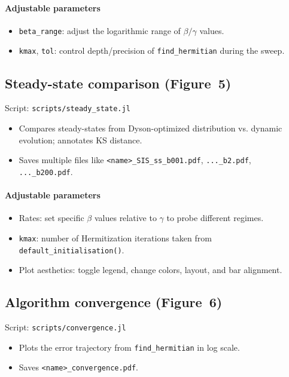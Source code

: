 \documentclass[11pt]{article}
\newcommand{\code}[1]{\texttt{#1}}
\begin{document}
  \paragraph{Adjustable parameters}
  \begin{itemize}
    \item \code{beta\_range}: adjust the logarithmic range of \(\beta/\gamma\) values.
    \item \code{kmax}, \code{tol}: control depth/precision of \code{find\_hermitian} during the sweep.
  \end{itemize}

\subsection{Steady-state comparison (Figure~5)}
  Script: \code{scripts/steady\_state.jl}
  \begin{itemize}
    \item Compares steady-states from Dyson-optimized distribution vs. dynamic evolution; annotates KS distance.
    \item Saves multiple files like \code{<name>\_SIS\_ss\_b001.pdf}, \code{...\_b2.pdf}, \code{...\_b200.pdf}.
  \end{itemize}

  \paragraph{Adjustable parameters}
  \begin{itemize}
    \item Rates: set specific \(\beta\) values relative to \(\gamma\) to probe different regimes.
    \item \code{kmax}: number of Hermitization iterations taken from \code{default\_initialisation()}.
    \item Plot aesthetics: toggle legend, change colors, layout, and bar alignment.
  \end{itemize}

\subsection{Algorithm convergence (Figure~6)}
  Script: \code{scripts/convergence.jl}
  \begin{itemize}
    \item Plots the error trajectory from \code{find\_hermitian} in log scale.
    \item Saves \code{<name>\_convergence.pdf}.
  \end{itemize}
\end{document}
